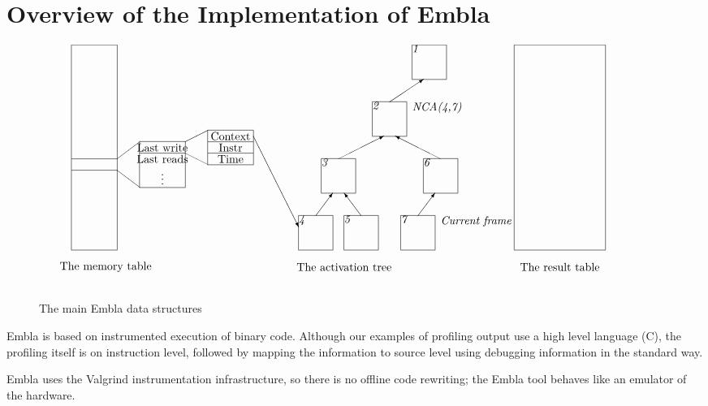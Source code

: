 \section{Overview of the Implementation of Embla}


\begin{figure*}
\small
\hrulefill
\[
\begin{picture}(500,210)(-30,0)
\put(-30,30){\framebox(40,180)[t]{\ }}
\put(-30,100){\line(1,0){40}}
\put(-30,110){\line(1,0){40}}
\put(-30,10){\makebox(60,10){The memory table}}
\put(10,110){\line(4,3){20}}
\put(10,100){\line(4,-3){20}}
\put(30,85){\framebox(40,40){\ }}
\put(30,115){\line(1,0){40}}
\put(30,115){\makebox(40,10){Last write}}
\put(30,105){\makebox(40,10){Last reads}}
\put(30,90){\makebox(40,10){\vdots}}
\put(70,125){\line(2,1){20}}
\put(70,115){\line(2,-1){20}}
\put(90,105){\framebox(40,30){\ }}
\put(90,125){\line(1,0){40}}
\put(90,115){\line(1,0){40}}
\put(90,105){\makebox(40,10){Time}}
\put(90,115){\makebox(40,10){Instr}}
\put(90,125){\makebox(40,10){Context}}
\put(130,130){\vector(1,-2){40}}
\put(270,180){\framebox(30,30)[tl]{\it 1}}
\put(235,130){\framebox(30,30)[tl]{\it 2}} \put(250,160){\vector(3,2){30}}
\put(270,150){\makebox(50,10)[l]{\it NCA(4,7)}}
\put(190,80){\framebox(30,30)[tl]{\it 3}} \put(205,110){\vector(2,1){40}}
\put(280,80){\framebox(30,30)[tl]{\it 6}} \put(295,110){\vector(-2,1){40}}
\put(170,30){\framebox(30,30)[tl]{\it 4}} \put(185,60){\vector(3,4){15}}
\put(210,30){\framebox(30,30)[tl]{\it 5}} \put(225,60){\vector(-3,4){15}}
\put(260,30){\framebox(30,30)[tl]{\it 7}} \put(275,60){\vector(3,4){15}}
\put(295,50){\makebox(50,10)[l]{\it Current frame}}
\put(170,10){\makebox(80,10){The activation tree}}
\put(360,30){\framebox(80,180){\ }}
\put(360,10){\makebox(80,10){The result table}}

\end{picture}
\]
\hrulefill
\caption{The main Embla data structures}
\label{fembladata}
\end{figure*}

Embla is based on instrumented execution of binary code. Although
our examples of profiling output use a high level language (C),
the profiling itself is on instruction level, followed by 
mapping the information to source level using debugging information 
in the standard way.

Embla uses the Valgrind instrumentation infrastructure, so there
is no offline code rewriting; the Embla tool behaves like an emulator
of the hardware.

